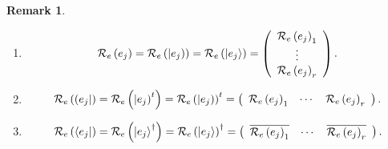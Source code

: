 \documentclass[aps,preprint]{revtex4}%
\newtheorem{remark}[theorem]{Remark}
\begin{document}
\begin{remark}
\begin{enumerate}
\item
\begin{equation}
\mathcal{R}_{e}\left(  e_{j}\right)  =\mathcal{R}_{e}\left(  \left\vert
e_{j}\right)  \right)  =\mathcal{R}_{e}\left(  \left\vert e_{j}\right\rangle
\right)  =\left(
\begin{array}
[c]{c}%
\mathcal{R}_{e}\left(  e_{j}\right)  _{1}\\
\vdots\\
\mathcal{R}_{e}\left(  e_{j}\right)  _{r}%
\end{array}
\right)  .
\end{equation}


\item
\begin{equation}
\mathcal{R}_{e}\left(  \left(  e_{j}\right\vert \right)  =\mathcal{R}%
_{e}\left(  \left\vert e_{j}\right)  ^{t}\right)  =\mathcal{R}_{e}\left(
\left\vert e_{j}\right)  \right)  ^{t}=\left(
\begin{array}
[c]{ccc}%
\mathcal{R}_{e}\left(  e_{j}\right)  _{1} & \cdots & \mathcal{R}_{e}\left(
e_{j}\right)  _{r}%
\end{array}
\right)  .
\end{equation}


\item
\begin{equation}
\mathcal{R}_{e}\left(  \left\langle e_{j}\right\vert \right)  =\mathcal{R}%
_{e}\left(  \left\vert e_{j}\right\rangle ^{\dagger}\right)  =\mathcal{R}%
_{e}\left(  \left\vert e_{j}\right\rangle \right)  ^{\dagger}=\left(
\begin{array}
[c]{ccc}%
\overline{\mathcal{R}_{e}\left(  e_{j}\right)  _{1}} & \cdots & \overline
{\mathcal{R}_{e}\left(  e_{j}\right)  _{r}}%
\end{array}
\right)  .
\end{equation}



\end{enumerate}
\end{remark}
\end{document}
